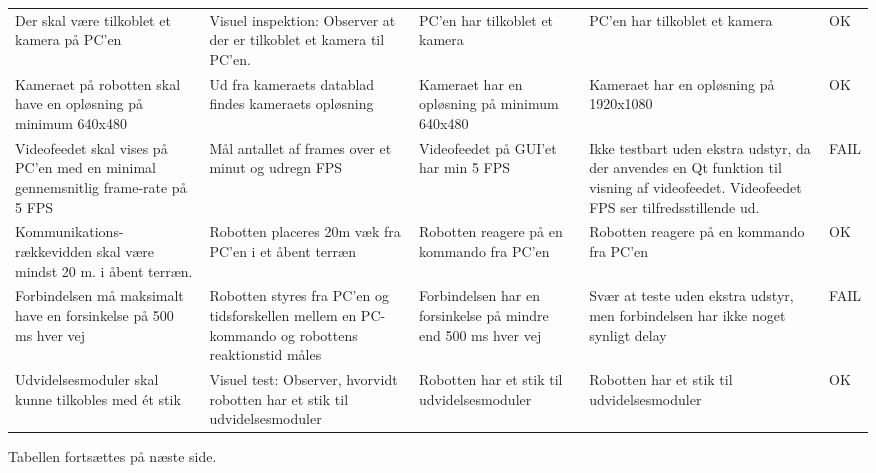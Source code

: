	\begin{tabu}{ X[l,1] X[l,1] X[l,1] X[l,1] X[l,0.9]}
	\hline
	Der skal være tilkoblet et kamera på PC'en & Visuel inspektion: Observer at der er tilkoblet et kamera til PC'en.  & PC'en har tilkoblet et kamera & PC'en har tilkoblet et kamera & OK \\
	\hdashline
	Kameraet på robotten skal have en opløsning på minimum 640x480 & Ud fra kameraets datablad findes kameraets opløsning  & Kameraet har en opløsning på minimum 640x480 & Kameraet har en opløsning på 1920x1080 & OK \\
	\hdashline
	Videofeedet skal vises på PC'en med en minimal gennemsnitlig frame-rate på 5 FPS & Mål antallet af frames over et minut og udregn FPS & Videofeedet på GUI'et har min 5 FPS & Ikke testbart uden ekstra udstyr, da der anvendes en Qt funktion til visning af videofeedet. Videofeedet FPS ser tilfredsstillende ud. & FAIL \\
	\hdashline
	Kommunikations-rækkevidden skal være mindst 20 m. i åbent terræn. & Robotten placeres 20m væk fra PC'en i et åbent terræn  & Robotten reagere på en kommando fra PC'en & Robotten reagere på en kommando fra PC'en & OK \\
	\hdashline
	Forbindelsen må maksimalt have en forsinkelse på 500 ms hver vej & Robotten styres fra PC'en og tidsforskellen mellem en PC-kommando og robottens reaktionstid måles & Forbindelsen har en forsinkelse på mindre end 500 ms hver vej & Svær at teste uden ekstra udstyr, men forbindelsen har ikke noget synligt delay & FAIL \\
	\hdashline
	Udvidelsesmoduler skal kunne tilkobles med ét stik & Visuel test: Observer, hvorvidt robotten har et stik til udvidelsesmoduler & Robotten har et stik til udvidelsesmoduler & Robotten har et stik til udvidelsesmoduler & OK \\
	\hline
\end{tabu}

Tabellen fortsættes på næste side.

